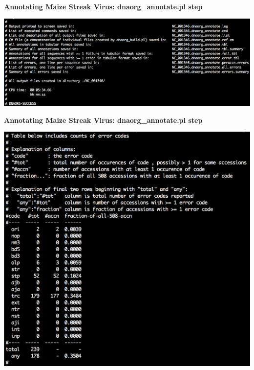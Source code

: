 \documentclass[landscape]{slides}
\begin{document}
\begin{slide}
\begin{center}
\textbf{Annotating Maize Streak Virus: dnaorg\_annotate.pl step} 

\includegraphics[width=8in]{figs/dnaorg-annotate-output2}

\end{center}
\vfill
\end{slide}
\begin{slide}
\begin{center}
\textbf{Annotating Maize Streak Virus: dnaorg\_annotate.pl step} 

\includegraphics[width=8in]{figs/dnaorg-annotate-output3}

\end{center}
\vfill
\end{slide}
\end{document}
